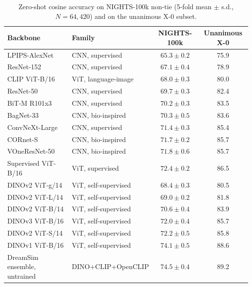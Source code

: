 \begin{table}[ht]
\caption{Zero-shot cosine accuracy on NIGHTS-100k non-tie (5-fold mean $\pm$ s.d., $N=64{,}420$) and on the unanimous X-0 subset.}
\label{tab:backbones}
\centering
\small
\begin{tabular}{llcc}
\toprule
Backbone & Family & NIGHTS-100k & Unanimous X-0 \\
\midrule
LPIPS-AlexNet          & CNN, supervised       & $65.3 \pm 0.2$ & 75.9 \\
ResNet-152             & CNN, supervised       & $67.1 \pm 0.4$ & 78.9 \\
CLIP ViT-B/16          & ViT, language-image   & $68.0 \pm 0.3$ & 80.0 \\
ResNet-50              & CNN, supervised       & $69.7 \pm 0.3$ & 82.4 \\
BiT-M R101x3           & CNN, supervised       & $70.2 \pm 0.3$ & 83.5 \\
BagNet-33              & CNN, bio-inspired     & $70.3 \pm 0.5$ & 83.6 \\
ConvNeXt-Large         & CNN, supervised       & $71.4 \pm 0.3$ & 85.4 \\
CORnet-S               & CNN, bio-inspired     & $71.7 \pm 0.2$ & 85.7 \\
VOneResNet-50          & CNN, bio-inspired     & $71.8 \pm 0.6$ & 85.7 \\
Supervised ViT-B/16    & ViT, supervised       & $72.4 \pm 0.2$ & 86.5 \\
\midrule
DINOv2 ViT-g/14        & ViT, self-supervised  & $68.4 \pm 0.3$ & 80.5 \\
DINOv2 ViT-L/14        & ViT, self-supervised  & $69.0 \pm 0.2$ & 81.8 \\
DINOv2 ViT-B/14        & ViT, self-supervised  & $70.6 \pm 0.4$ & 83.9 \\
DINOv3 ViT-B/16        & ViT, self-supervised  & $72.0 \pm 0.4$ & 85.7 \\
DINOv2 ViT-S/14        & ViT, self-supervised  & $72.2 \pm 0.5$ & 85.8 \\
DINOv1 ViT-B/16        & ViT, self-supervised  & $74.1 \pm 0.5$ & 88.6 \\
\midrule
DreamSim ensemble, untrained & DINO+CLIP+OpenCLIP & $74.5 \pm 0.4$ & 89.2 \\
\bottomrule
\end{tabular}
\end{table}

\vspace{1em}

